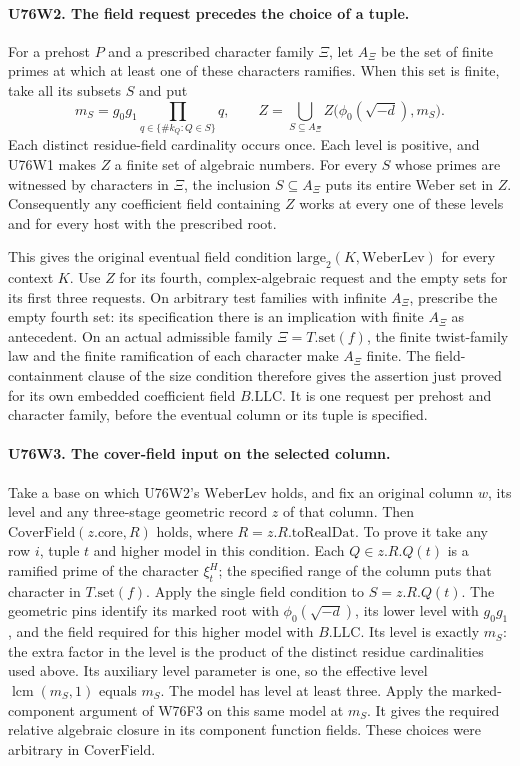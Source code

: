 \paragraph{U76W2. The field request precedes the choice of a tuple.}
For a prehost $P$ and a prescribed character family $\Xi$, let
$A_\Xi$ be the set of finite primes at which at least one of these
characters ramifies. When this set is finite, take all its
subsets $S$ and put
\[
 m_S=g_0g_1\prod_{q\in\{\#k_Q:Q\in S\}}q,\qquad
 Z=\bigcup_{S\subseteq A_\Xi}
 Z\bigl(\phi_0(\sqrt{-d}),m_S\bigr).
\]
Each distinct residue-field cardinality occurs once. Each level is
positive, and U76W1 makes $Z$ a finite set of algebraic numbers.
For every $S$ whose primes are witnessed by characters in $\Xi$,
the inclusion $S\subseteq A_\Xi$ puts its entire Weber set in $Z$.
Consequently any coefficient field containing $Z$ works at every
one of these levels and for every host with the prescribed root.

This gives the original eventual field condition
$\mathrm{large}_2(K,\mathrm{WeberLev})$ for every context $K$.
Use $Z$ for its fourth, complex-algebraic request and the empty
sets for its first three requests. On arbitrary test families with
infinite $A_\Xi$, prescribe the empty fourth set: its specification
there is an implication with finite $A_\Xi$ as antecedent.
On an actual admissible family $\Xi=T.\mathrm{set}(f)$, the finite
twist-family law and the finite ramification of each character make
$A_\Xi$ finite. The field-containment clause of the size condition
therefore gives the assertion just proved for its own embedded
coefficient field $B.\mathrm{LLC}$. It is one request per prehost
and character family, before the eventual column or its tuple is
specified.

\paragraph{U76W3. The cover-field input on the selected column.}
Take a base on which U76W2's $\mathrm{WeberLev}$ holds, and fix an
original column $w$, its level and any three-stage geometric record
$z$ of that column. Then $\mathrm{CoverField}(z.\mathrm{core},R)$
holds, where $R=z.R.\mathrm{toRealDat}$. To prove it take any
row $i$, tuple $t$ and higher model in this condition. Each
$Q\in z.R.Q(t)$ is a ramified prime of the character $\xi_t^H$;
the specified range of the column puts that character in
$T.\mathrm{set}(f)$. Apply the single field condition to
$S=z.R.Q(t)$. The geometric pins identify its marked root
with $\phi_0(\sqrt{-d})$, its lower level with $g_0g_1$, and the
field required for this higher model with $B.\mathrm{LLC}$.
Its level is exactly $m_S$: the extra factor in the level is
the product of the distinct residue cardinalities used above.
Its auxiliary level parameter is one, so the effective level
$\operatorname{lcm}(m_S,1)$ equals $m_S$. The model has level
at least three. Apply the marked-component argument of W76F3 on
this same model at $m_S$. It gives the required relative
algebraic closure in its component function fields. These
choices were arbitrary in $\mathrm{CoverField}$.

